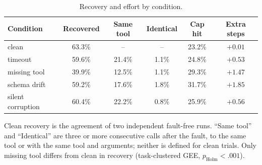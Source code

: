 \begin{table}[!t]
\centering
\caption{Recovery and effort by condition.}
\label{tab:rq3}
\footnotesize
\setlength{\tabcolsep}{3pt}
\begin{tabular}{lccccc}
\hline
Condition & Recovered & Same tool & Identical & Cap hit & Extra steps \\
\hline
clean & 63.3\% & -- & -- & 23.2\% & $+0.01$ \\
timeout & 59.6\% & 21.4\% & 1.1\% & 24.8\% & $+0.53$ \\
missing tool & 39.9\% & 12.5\% & 1.1\% & 29.3\% & $+1.47$ \\
schema drift & 59.2\% & 17.6\% & 1.8\% & 31.7\% & $+1.85$ \\
silent corruption & 60.4\% & 22.2\% & 0.8\% & 25.9\% & $+0.56$ \\
\hline
\end{tabular}
\par\smallskip\scriptsize Clean recovery is the agreement of two independent fault-free runs. ``Same tool'' and ``Identical'' are three or more consecutive calls after the fault, to the same tool or with the same tool and arguments; neither is defined for clean trials. Only missing tool differs from clean in recovery (task-clustered GEE, $p_{\text{Holm}} < .001$).
\end{table}
